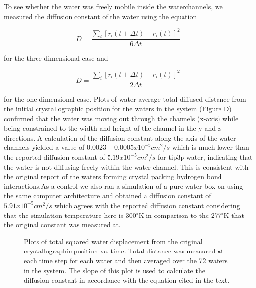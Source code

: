 \documentclass[12pt,letterpaper]{report}
\newcommand{\degr}{\ensuremath{^\circ}}
\begin{document}
\begin{enumerate}
To see whether the water was freely mobile inside the waterchannels, we measured the diffusion constant of the water using the equation 

$$D=\dfrac{\sum_{i}[r_i(t+\Delta t)-r_i(t)]^2}{6{\Delta}t}$$

for the three dimensional case and 

$$D=\dfrac{\sum_{i}[r_i(t+\Delta t)-r_i(t)]^2}{2{\Delta}t}$$

for the one dimensional case. Plots of water average total diffused distance from the initial crystallographic position for the waters in the system (Figure D) confirmed that the water was moving out through the channels (x-axis) while being constrained to the width and height of the channel in the y and z directions. A calculation of the diffusion constant along the axis of the water channels yielded a value of $0.0023\pm0.0005 x10^{-5} cm^2/s$ which is much lower than the reported diffusion constant of $5.19x10^{-5} cm^2/s$ for tip3p water, indicating that the water is not diffusing freely within the water channel. This is consistent with the original report of the waters forming crystal packing hydrogen bond interactions.As a control we also ran a simulation of a pure water box on using the same computer architecture and obtained a diffusion constant of $5.91x10^{-5} cm^2/s$ which agrees with the reported diffusion constant considering that the simulation temperature here is 300\degr K in comparison to the 277\degr K that the original constant was measured at.

	\begin{figure}[H]
	\centering
	\setcounter{subfigure}{0}
	\quad
	\caption{Plots of total squared water displacement from the original crystallographic position vs. time. Total distance was measured at each time step for each water and then averaged over the 72 waters in the system. The slope of this plot is used to calculate the diffusion constant in accordance with the equation cited in the text.}
	\end{figure}


\end{enumerate}
\end{document}

